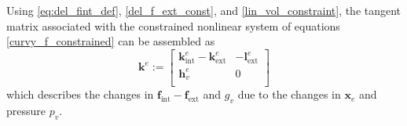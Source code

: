 Using \eqref{eq:del_fint_def}, \eqref{del_f_ext_const}, and \eqref{lin_vol_constraint}, the tangent matrix associated
 with the constrained nonlinear system of equations \eqref{curvy_f_constrained} can be assembled as
 \begin{equation} \label{final_tangent_matrix}
    \mathbf{k}^{e} := \begin{bmatrix}
        \mathbf{k}^{e}_{\text{int}} - \mathbf{k}^{e}_{\text{ext}} & -\mathbf{l}^{e}_{\text{ext}}\\
        \mathbf{h}_{v}^{e} & 0\\
    \end{bmatrix}
\end{equation}
which describes the changes in $\mathbf{f}_{\text{int}} - \mathbf{f}_{\text{ext}}$ and $g_{v}$ due to the changes in $\mathbf{x}_{e}$ and pressure $p_{v}$.

